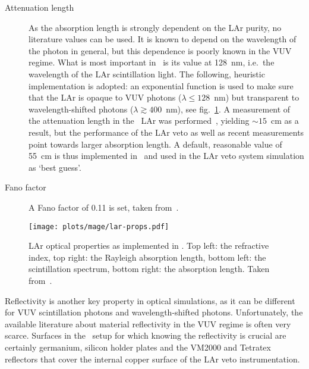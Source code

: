 \begin{description}
  \item[Attenuation length] As the absorption length is strongly dependent on the LAr
    purity, no literature values can be used. It is known to depend on the wavelength of
    the photon in general, but this dependence is poorly known in the VUV regime. What is
    most important in \mage\ is its value at 128~nm, i.e.~the wavelength of the LAr
    scintillation light. The following, heuristic implementation is adopted: an
    exponential function is used to make sure that the LAr is opaque to VUV photons
    ($\lambda \leq 128$~nm) but transparent to wavelength-shifted photons ($\lambda
    \gtrsim 400$~nm), see fig.~\ref{fig:bkg:lar:ph2:mage:lar-props}. A measurement of the
    attenuation length in the \gerda\ LAr was performed~\cite{Barros2020}, yielding
    $\sim15$~cm as a result, but the performance of the LAr veto as well as recent
    measurements point towards larger absorption length. A default, reasonable value of
    55~cm is thus implemented in \mage\ and used in the LAr veto system simulation as
    `best guess'.

  \item[Fano factor] A Fano factor of 0.11 is set, taken from~\cite{Doke1976}.

\end{description}

\begin{figure}
  \centering
  \texttt{[image: plots/mage/lar-props.pdf]}
  \caption{%
    LAr optical properties as implemented in \mage. Top left: the refractive index, top
    right: the Rayleigh absorption length, bottom left: the scintillation spectrum, bottom
    right: the absorption length. Taken from~\cite{Bideau-Mehu1981, Seidel2002,
    Heindl2010}.
  }\label{fig:bkg:lar:ph2:mage:lar-props}
\end{figure}

Reflectivity is another key property in optical simulations, as it can be different for
VUV scintillation photons and wavelength-shifted photons. Unfortunately, the available
literature about material reflectivity in the VUV regime is often very scarce. Surfaces
in the \gerda\ setup for which knowing the reflectivity is crucial are certainly
germanium, silicon holder plates and the VM2000 and Tetratex\reg{} reflectors that cover
the internal copper surface of the LAr veto instrumentation.

